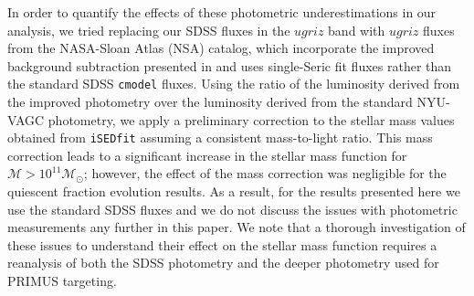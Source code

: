 In order to quantify the effects of these photometric underestimations
in our analysis, we tried replacing our SDSS fluxes in the $ugriz$
band with $ugriz$ fluxes from the NASA-Sloan Atlas (NSA) catalog,
which incorporate the improved background subtraction presented in
\cite{Blanton:2011aa} and uses single-Seric fit fluxes rather than the
standard SDSS \texttt{cmodel} fluxes. Using the ratio of the
luminosity derived from the improved photometry over the luminosity
derived from the standard NYU-VAGC photometry, we apply a preliminary
correction to the stellar mass values obtained from \texttt{iSEDfit}
assuming a consistent mass-to-light ratio. This mass correction leads
to a significant increase in the stellar mass function for
$\mathcal{M} > 10^{11} \mathcal{M}_{\odot}$; however, the effect of
the mass correction was negligible for the quiescent fraction
evolution results. As a result, for the results presented here we use
the standard SDSS fluxes and we do not discuss the issues with
photometric measurements any further in this paper. We note that a
thorough investigation of these issues to understand their effect on
the stellar mass function requires a reanalysis of both the SDSS
photometry and the deeper photometry used for PRIMUS targeting.

